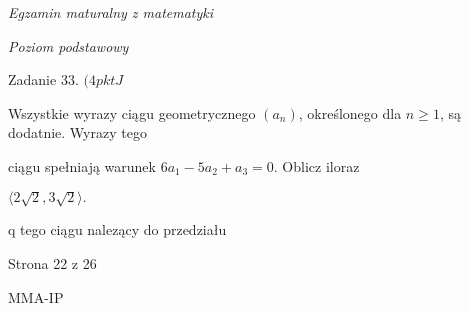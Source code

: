 \documentclass[a4paper,12pt]{article}
\begin{document}
{\it Egzamin maturalny z matematyki}

{\it Poziom podstawowy}

Zadanie 33. $(4pktJ$

Wszystkie wyrazy ciągu geometrycznego $(a_{n})$, określonego dla $n\geq 1$, są dodatnie. Wyrazy tego

ciągu spełniają warunek $6a_{1}-5a_{2}+a_{3}=0$. Oblicz iloraz

$\langle 2\sqrt{2}, 3\sqrt{2}\rangle.$

q tego ciągu nalezący do przedziału

Strona 22 z 26

MMA-IP
\end{document}
